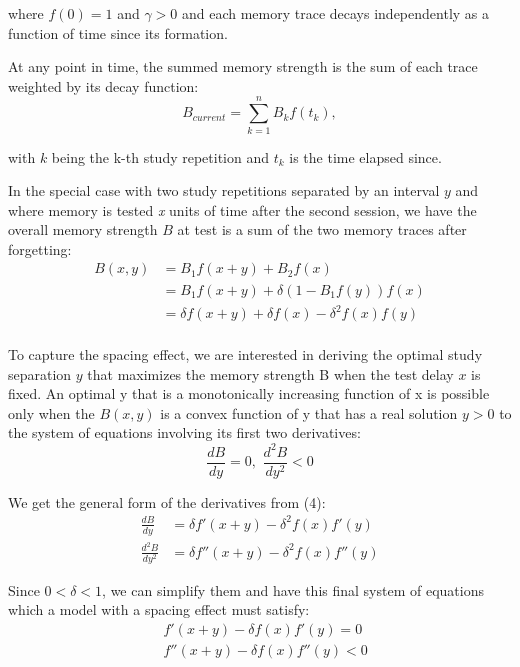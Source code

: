 \documentclass[man, 12pt, floatsintext]{apa6}
\theoremstyle{definition}
\theoremstyle{remark}
\begin{document}
\noindent where $f(0)=1$ and $\gamma > 0$ and each memory trace decays independently as a function of time since its formation.

At any point in time, the summed memory strength is the sum of each trace weighted by its decay function:
\begin{equation}
  B_{current} = \sum_{k=1}^{n} B_k f(t_k),
\end{equation}

\noindent with $k$ being the k-th study repetition and $t_k$ is the time elapsed since.

In the special case with two study repetitions separated by an interval $y$ and where memory is tested \textit{x} units of time after the second session, we have the overall memory strength $B$ at test is a sum of the two memory traces after forgetting:
\begin{equation}\label{eq:B}
  \begin{aligned}
    B(x,y) &= B_{1} f(x+y) + B_{2} f(x)\\
    &= B_{1} f(x+y) + \delta (1 - B_{1} f(y)) f(x)\\
    &= \delta f(x+y) + \delta f(x) - \delta^2 f(x) f(y)\\
  \end{aligned}
\end{equation}

To capture the spacing effect, we are interested in deriving the optimal study separation $y$ that maximizes the memory strength B when the test delay $x$ is fixed. An optimal y that is a monotonically increasing function of x is possible only when the $B(x,y)$ is a convex function of y that has a real solution $y > 0$ to the system of equations involving its first two derivatives:
\begin{equation}
  \frac{dB}{dy} = 0  ,\,\, \frac{d^2B}{dy^2} < 0
\end{equation}

We get the general form of the derivatives from (4):
\begin{equation}
  \begin{aligned}
    \frac{dB}{dy} &= \delta f'(x+y) - \delta^2 f(x) f'(y) \\
    \frac{d^2B}{dy^2} &= \delta f''(x+y) - \delta^2 f(x) f''(y)
  \end{aligned}
\end{equation}

Since $0 < \delta < 1$, we can simplify them and have this final system of equations which a model with a spacing effect must satisfy:
\begin{equation}
  \begin{aligned}
    & f'(x+y) - \delta f(x) f'(y) = 0\\
    & f''(x+y) - \delta f(x) f''(y) < 0
  \end{aligned}
\end{equation}
\end{document}
